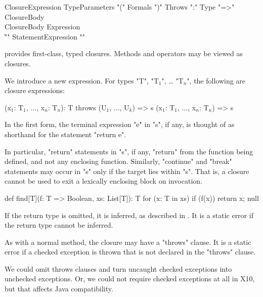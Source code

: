 \begin{grammar}
ClosureExpression \:
        TypeParameters\opt
        \xcd"("
        Formals\opt
        \xcd")"
        Throws\opt
        \xcd":" Type
        \xcd"=>" ClosureBody \\
ClosureBody \:
        Expression \\
        \| \xcd"{" Statement\star Expression \xcd"}" \\
\end{grammar}


\Xten{} provides first-class, typed closures.
Methods and operators may be viewed as closures.

We introduce a new expression. For types \xcd"T",
\xcdmath"T$_1$", \dots
\xcdmath"T$_n$", the following are closure expressions:

\begin{xtenmath}
(x$_1$: T$_1$, $\dots$, x$_n$: T$_n$): T throws (U$_1$, $\dots$, U$_k$) => { s }
(x$_1$: T$_1$, $\dots$, x$_n$: T$_n$) => { s }
\end{xtenmath}

In the first form, the terminal expression \xcd"e" in
\xcd"s", if any, is thought of as shorthand for the statement
\xcd"return e".

In particular, \xcd"return" statements in \xcd"s", if any,
\xcd"return" from the function
being defined, and not any enclosing function. Similarly,
\xcd"continue" and
\xcd"break" statements may occur in \xcd"s" only if the target
lies within \xcd"s". That
is, a closure cannot be used to exit a lexically enclosing block on
invocation.

\begin{example}
\begin{xten}
def find[T](f: T => Boolean, xs: List[T]): T {
  for (x: T in xs)
    if (f(x)) return x;
  null
}
\end{xten}
\end{example}

If the return type is omitted, it is inferred, as described in
.
It is a static error if the return type cannot be inferred.

As with a normal method, the closure may have a \xcd"throws" clause. It is a
static error if a checked exception is thrown that is not declared in
the \xcd"throws" clause.

\begin{note}
We could omit throws clauses and turn uncaught checked
exceptions into unchecked exceptions. Or, we could not require checked
exceptions at all in X10, but that affects Java compatibility.
\end{note}


